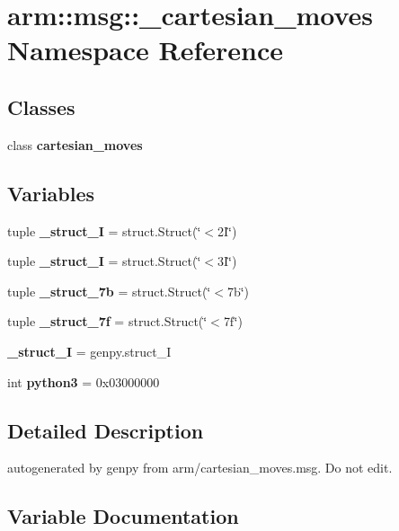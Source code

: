 \section{arm\-:\-:msg\-:\-:\-\_\-cartesian\-\_\-moves \-Namespace \-Reference}
\label{namespacearm_1_1msg_1_1__cartesian__moves}
\subsection*{\-Classes}
\begin{DoxyCompactItemize}
\item 
class {\bf cartesian\-\_\-moves}
\end{DoxyCompactItemize}
\subsection*{\-Variables}
\begin{DoxyCompactItemize}
\item 
tuple {\bf \-\_\-struct\-\_\-I} = struct.\-Struct(\char`\"{}$<$2\-I\char`\"{})
\item 
tuple {\bf \-\_\-struct\-\_\-I} = struct.\-Struct(\char`\"{}$<$3\-I\char`\"{})
\item 
tuple {\bf \-\_\-struct\-\_\-7b} = struct.\-Struct(\char`\"{}$<$7b\char`\"{})
\item 
tuple {\bf \-\_\-struct\-\_\-7f} = struct.\-Struct(\char`\"{}$<$7f\char`\"{})
\item 
{\bf \-\_\-struct\-\_\-\-I} = genpy.\-struct\-\_\-\-I
\item 
int {\bf python3} = 0x03000000
\end{DoxyCompactItemize}


\subsection{\-Detailed \-Description}
\begin{DoxyVerb}autogenerated by genpy from arm/cartesian_moves.msg. Do not edit.\end{DoxyVerb}
 

\subsection{\-Variable \-Documentation}
